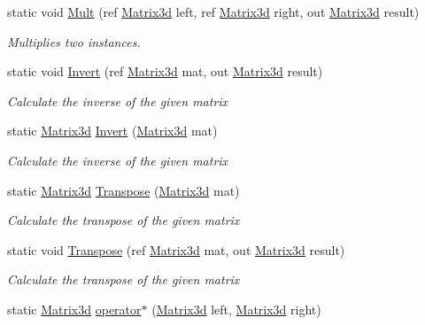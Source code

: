 \begin{DoxyCompactItemize}
static void \hyperlink{struct_open_t_k_1_1_matrix3d_a2aa8e2c9220ccf463eb717c93c179b05}{Mult} (ref \hyperlink{struct_open_t_k_1_1_matrix3d}{Matrix3d} left, ref \hyperlink{struct_open_t_k_1_1_matrix3d}{Matrix3d} right, out \hyperlink{struct_open_t_k_1_1_matrix3d}{Matrix3d} result)
\begin{DoxyCompactList}\small\item\em Multiplies two instances. \end{DoxyCompactList}\item 
static void \hyperlink{struct_open_t_k_1_1_matrix3d_a37daecec9a2d2f36f92384ef129bf345}{Invert} (ref \hyperlink{struct_open_t_k_1_1_matrix3d}{Matrix3d} mat, out \hyperlink{struct_open_t_k_1_1_matrix3d}{Matrix3d} result)
\begin{DoxyCompactList}\small\item\em Calculate the inverse of the given matrix \end{DoxyCompactList}\item 
static \hyperlink{struct_open_t_k_1_1_matrix3d}{Matrix3d} \hyperlink{struct_open_t_k_1_1_matrix3d_a7e38d6e2366215c54892c1d81bdcb5fe}{Invert} (\hyperlink{struct_open_t_k_1_1_matrix3d}{Matrix3d} mat)
\begin{DoxyCompactList}\small\item\em Calculate the inverse of the given matrix \end{DoxyCompactList}\item 
static \hyperlink{struct_open_t_k_1_1_matrix3d}{Matrix3d} \hyperlink{struct_open_t_k_1_1_matrix3d_a09452e91ab7fd63f92084593cd576607}{Transpose} (\hyperlink{struct_open_t_k_1_1_matrix3d}{Matrix3d} mat)
\begin{DoxyCompactList}\small\item\em Calculate the transpose of the given matrix \end{DoxyCompactList}\item 
static void \hyperlink{struct_open_t_k_1_1_matrix3d_ab92cb44577694f731a8eb3cdd39038fe}{Transpose} (ref \hyperlink{struct_open_t_k_1_1_matrix3d}{Matrix3d} mat, out \hyperlink{struct_open_t_k_1_1_matrix3d}{Matrix3d} result)
\begin{DoxyCompactList}\small\item\em Calculate the transpose of the given matrix \end{DoxyCompactList}\item 
static \hyperlink{struct_open_t_k_1_1_matrix3d}{Matrix3d} \hyperlink{struct_open_t_k_1_1_matrix3d_a00cca7f2e3e2e280b821d4aa991e1914}{operator$\ast$} (\hyperlink{struct_open_t_k_1_1_matrix3d}{Matrix3d} left, \hyperlink{struct_open_t_k_1_1_matrix3d}{Matrix3d} right)

\end{DoxyCompactItemize}
